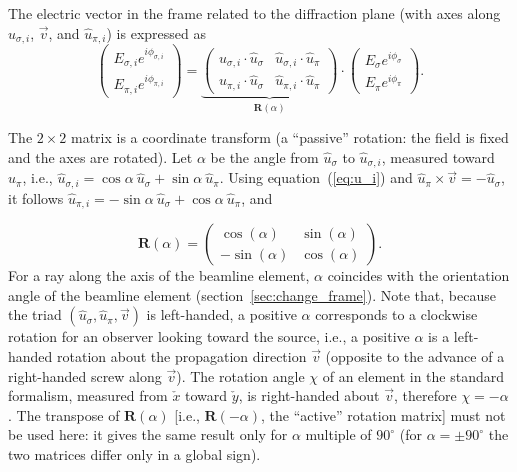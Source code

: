 \documentclass{iucr}
\begin{document}
The electric vector in the frame related to the diffraction plane (with axes along $\hat{u}_{\sigma,i}$, $\vec{v}$, and $\hat{u}_{\pi,i}$) is expressed as 
\begin{equation}
  \left( \begin{array}{c}
    E_{\sigma,i} e^{i \phi_{\sigma,i}} \\
    E_{\pi,i} e^{i \phi_{\pi,i}}
  \end{array} \right)
  =
  \underbrace{
  \left( \begin{array}{cc}
    \hat{u}_{\sigma,i} \cdot \hat{u}_{\sigma} &
    \hat{u}_{\sigma,i} \cdot \hat{u}_{\pi} \\
    \hat{u}_{\pi,i} \cdot \hat{u}_{\sigma} &
    \hat{u}_{\pi,i} \cdot \hat{u}_{\pi} 
  \end{array} \right)
  }_{\textbf{R}(\alpha)}
  \cdot
  \left( \begin{array}{c}
    E_{\sigma} e^{i \phi_{\sigma}} \\
    E_{\pi} e^{i \phi_{\pi}}
  \end{array} \right).
\end{equation}

The $2\times 2$ matrix is a coordinate transform (a ``passive'' rotation: the field is fixed and the axes are rotated). Let $\alpha$ be the angle from $\hat{u}_\sigma$ to $\hat{u}_{\sigma,i}$, measured toward $\hat{u}_\pi$, i.e., $\hat{u}_{\sigma,i}=\cos\alpha~\hat{u}_\sigma + \sin\alpha~\hat{u}_\pi$. Using equation~(\ref{eq:u_i}) and $\hat{u}_\pi \times \vec{v} = -\hat{u}_\sigma$, it follows $\hat{u}_{\pi,i}=-\sin\alpha~\hat{u}_\sigma + \cos\alpha~\hat{u}_\pi$, and

\begin{equation}\label{eq:rotation}
  \textbf{R}(\alpha)
  =
  \left( \begin{array}{cc}
    \cos(\alpha) & \sin(\alpha) \\
    -\sin(\alpha) & \cos(\alpha)
 \end{array} \right).
\end{equation}
For a ray along the axis of the beamline element, $\alpha$ coincides with the orientation angle of the beamline element (section~\ref{sec:change_frame}).
Note that, because the triad $(\hat{u}_\sigma, \hat{u}_\pi, \vec{v})$ is left-handed, a positive $\alpha$ corresponds to a clockwise rotation for an observer looking toward the source, i.e., a positive $\alpha$ is a left-handed rotation about the propagation direction $\vec{v}$ (opposite to the advance of a right-handed screw along $\vec{v}$). The rotation angle $\chi$ of an element in the standard formalism, measured from $\check{x}$ toward $\check{y}$, is right-handed about $\vec{v}$, therefore $\chi=-\alpha$.
The transpose of $\textbf{R}(\alpha)$ [i.e., $\textbf{R}(-\alpha)$, the ``active'' rotation matrix] must not be used here: it gives the same result only for $\alpha$ multiple of $90^\circ$ (for $\alpha=\pm 90^\circ$ the two matrices differ only in a global sign).
\end{document}
